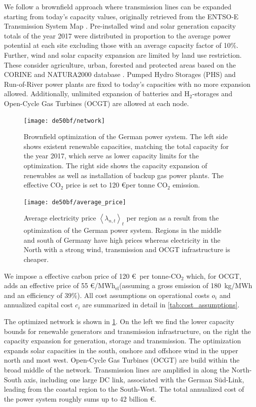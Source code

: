 \documentclass[11pt,twocolumn]{article}
\newcommand{\lmp}[1][n]{\lambda_{#1,t}}
\newcommand{\averagelmp}{\left<\lmp\right>_t}
\newcommand{\megawatthour}{MWh$_\text{el}$}
\begin{document}
We follow a brownfield approach where transmission lines can be expanded starting from today's capacity values, originally retrieved from the ENTSO-E Transmission System Map \cite{entso-e_entso-e_nodate}. Pre-installed wind and solar generation capacity totals of the year 2017 were distributed in proportion to the average power potential at each site excluding those with an average capacity factor of 10\%. Further, wind and solar capacity expansion are limited by land use restriction. These consider agriculture, urban, forested and protected areas based on the CORINE and NATURA2000 database \cite{corine2012,natura2000}. Pumped Hydro Storages (PHS) and Run-of-River power plants are fixed to today's capacities with no more expansion allowed. Additionally, unlimited expansion of batteries and H$_{2}$-storages and Open-Cycle Gas Turbines (OCGT) are allowed at each node. 
% 
\begin{figure}[t]
    \centering
    \texttt{[image: de50bf/network]}
    \caption{Brownfield optimization of the German power system. The left side shows existent renewable capacities, matching the total capacity for the year 2017, which serve as lower capacity limits for the optimization. The right side shows the capacity expansion of renewables as well as installation of backup gas power plants. The effective CO$_2$ price is set to 120 \euro per tonne CO$_2$ emission.}
    \label{fig:network}
\end{figure}
% 
\begin{figure}
    \centering
    \texttt{[image: de50bf/average\_price]}
    \caption{Average electricity price $\averagelmp$ per region as a result from the optimization of the German power system. Regions in the middle and south of Germany have high prices whereas electricity in the North with a strong wind, transmission and OCGT infrastructure is cheaper.}
    \label{fig:average_price}
\end{figure}
We impose a effective carbon price of 120 \euro\, per tonne-CO$_{2}$ which, for OCGT, adds an effective price of 55 \euro/\megawatthour (assuming a gross emission of 180~kg/MWh and an efficiency of 39\%). All cost assumptions on operational costs $o_i$ and annualized capital cost $c_i$ are summarized in detail in \cref{tab:cost_assumptions}. 

The optimized network is shown in  \cref{fig:network}. On the left we find the lower capacity bounds for renewable generators and transmission infrastructure, on the right the capacity expansion for generation, storage and transmission. The optimization expands solar capacities in the south, onshore and offshore wind in the upper north and most west. Open-Cycle Gas Turbines (OCGT) are build within the broad middle of the network. Transmission lines are amplified in along the North-South axis, including one large DC link, associated with the German S\"ud-Link, leading from the coastal region to the South-West. 
The total annualized cost of the power system roughly sums up to 42 billion \euro.
% 
\end{document}
